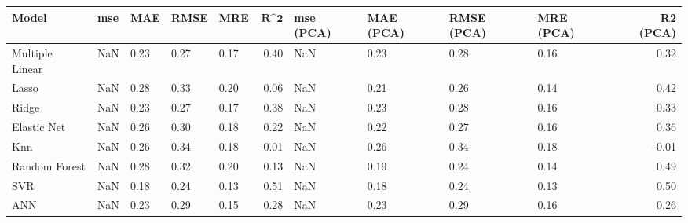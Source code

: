 \begin{table}
\centering
\label{table:iri_reg_pred}
\begin{tabular}{lllllrllllr}
\toprule
 \textbf{Model} & \textbf{mse} & \textbf{MAE} & \textbf{RMSE} & \textbf{MRE} & $\textbf{R^2}$ & \textbf{mse (PCA)} & \textbf{MAE (PCA)} & \textbf{RMSE (PCA)} & \textbf{MRE (PCA)} & \textbf{R2 (PCA)} \\
\midrule
Multiple Linear &          NaN &         0.23 &          0.27 &         0.17 &           0.40 &                NaN &               0.23 &                0.28 &               0.16 &              0.32 \\
          Lasso &          NaN &         0.28 &          0.33 &         0.20 &           0.06 &                NaN &               0.21 &                0.26 &               0.14 &              0.42 \\
          Ridge &          NaN &         0.23 &          0.27 &         0.17 &           0.38 &                NaN &               0.23 &                0.28 &               0.16 &              0.33 \\
    Elastic Net &          NaN &         0.26 &          0.30 &         0.18 &           0.22 &                NaN &               0.22 &                0.27 &               0.16 &              0.36 \\
            Knn &          NaN &         0.26 &          0.34 &         0.18 &          -0.01 &                NaN &               0.26 &                0.34 &               0.18 &             -0.01 \\
  Random Forest &          NaN &         0.28 &          0.32 &         0.20 &           0.13 &                NaN &               0.19 &                0.24 &               0.14 &              0.49 \\
            SVR &          NaN &         0.18 &          0.24 &         0.13 &           0.51 &                NaN &               0.18 &                0.24 &               0.13 &              0.50 \\
            ANN &          NaN &         0.23 &          0.29 &         0.15 &           0.28 &                NaN &               0.23 &                0.29 &               0.16 &              0.26 \\
\bottomrule
\end{tabular}
\end{table}
